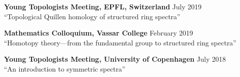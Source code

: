 \documentclass[10pt,letterpaper]{article}
\renewenvironment{itemize}{
  \begin{list}{}{
    \setlength{\leftmargin}{1.5em}
    \setlength{\itemsep}{0.25em}
    \setlength{\parskip}{0pt}
    \setlength{\parsep}{0.25em}
  }
}{
  \end{list}
}
\begin{document}
\begin{itemize}
\item {\bf Young Topologists Meeting, EPFL, Switzerland} \hfill July 2019 \\
``Topological Quillen homology of structured ring spectra''
 
 
\item {\bf Mathematics Colloquium, Vassar College} \hfill February 2019 \\
``Homotopy theory---from the fundamental group to structured ring spectra''

  \item {\bf Young Topologists Meeting, University of Copenhagen} \hfill July 2018 \\
 ``An introduction to symmetric spectra''

\end{itemize}
\end{document}
